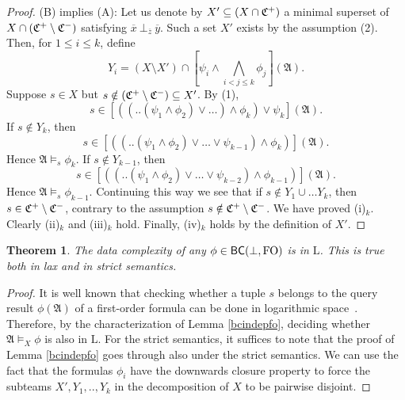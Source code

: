 \documentclass{article}
\theoremstyle{plain}
\newtheorem{theorem}{Theorem}
\theoremstyle{definition}
\newcommand{\mA}{{\mathfrak A}}
\newcommand{\ma}{{\mathfrak A}}
\newcommand{\tu}[1]{\overline{#1}}
\newcommand{\indep}[3]{{#1}\ \bot_{#2}\ {#3}}
\begin{document}
\begin{proof}
 (B) implies (A): Let us denote by $X' \subseteq (X\cap \mathfrak{C}^{+} )$ a minimal superset of   $X\cap(\mathfrak{C}^{+}\setminus \mathfrak{C}^{-})$ satisfying   $\indep {\tu x}{\tu z}{\tu y}$. Such a set $X'$ exists by the assumption (2). Then, for $1\le i\le k$, define
 $$Y_i=(X\setminus X') \cap[\psi_i\wedge \bigwedge_{i<j\le k}\phi_{j}](\mA).$$
 Suppose $s\in X$ but $s\notin (\mathfrak{C}^{+}\setminus \mathfrak{C}^{-})\subseteq X'$. By (1), $$s\in[((..(\psi_1\wedge \phi_2) \vee \dots ) \wedge \phi_k) \vee \psi_k](\mA).$$ If $s\notin Y_k$, then  
 $$s\in[((..(\psi_1\wedge \phi_2) \vee \dots \vee\psi_{k-1}) \wedge \phi_k)](\mA).$$ Hence $\ma\models_s \phi_k$.
 If $s\notin Y_{k-1}$, then 
 $$s\in[((..(\psi_1\wedge \phi_2) \vee \dots \vee\psi_{k-2}) \wedge \phi_{k-1})](\mA).$$ Hence 
 $\ma\models_s\phi_{k-1}$. Continuing this way we see that if $s\notin Y_1\cup\ldots Y_k$, then $s\in \mathfrak{C}^{+}\setminus\mathfrak{C}^{-}$, contrary to the assumption  $s\notin \mathfrak{C}^{+}\setminus \mathfrak{C}^{-}$. We have proved (i)$_{k}$. Clearly (ii)$_{k}$ and  (iii)$_{k}$ hold. Finally, (iv)$_{k}$ holds by the definition of $X'$.
\end{proof}









\begin{theorem}\label{BC(top,FO)} The data complexity of any $\phi\in\mathsf{BC}(\bot,{\rm FO})$ is in $\mathrm{L}$. This is true both in lax and in strict semantics.\end{theorem}
\begin{proof}
It is well known that checking whether a tuple $s$ belongs to the query result $\phi(\mA)$ of a first-order formula can be done in logarithmic space~\cite{Immerman99}.  Therefore, by the characterization of Lemma \ref{bcindepfo}, deciding whether $\mA\models_X\phi$ is also in $\mathrm{L}$.
For the strict semantics, it suffices to note that the proof of Lemma \ref{bcindepfo}  goes through  also under the strict semantics. We can use the fact that the formulas $\phi_i$ have the downwards closure property to force the  subteams $X', Y_1,..,Y_k$ in the decomposition of $X$ to be pairwise disjoint.
\end{proof}
\end{document}
